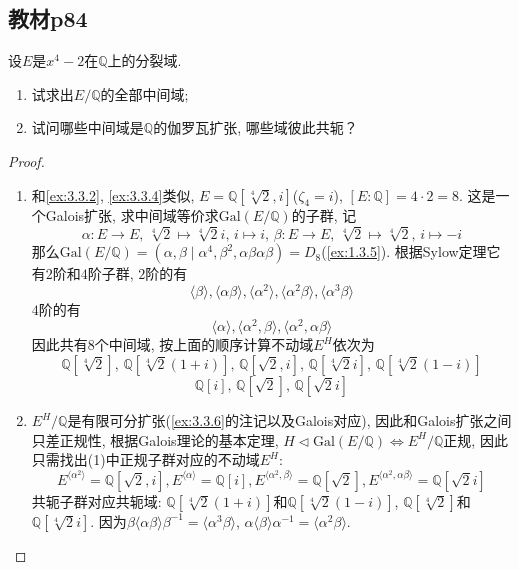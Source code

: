\subsection{教材p84}

\begin{problem}
    设$E$是$x^4-2$在$\mathbb{Q}$上的分裂域.
    \begin{enumerate}[(1)]
        \item 试求出$E/\mathbb{Q}$的全部中间域;
        \item 试问哪些中间域是$\mathbb{Q}$的伽罗瓦扩张, 哪些域彼此共轭？
    \end{enumerate}
\end{problem}

\begin{proof}
    \begin{enumerate}[(1)]
        \item 和\ref{ex:3.3.2}, \ref{ex:3.3.4}类似, $E = \mathbb{Q}[\sqrt[4]{2}, i]$($\zeta_4 = i$), $[E:\mathbb{Q}] = 4 \cdot 2 = 8$. 这是一个Galois扩张, 求中间域等价求$\mathrm{Gal}(E/\mathbb{Q})$的子群, 记
        \[
            \alpha:E \to E,\, \sqrt[4]{2} \mapsto \sqrt[4]{2}i,\, i \mapsto i,\, \beta:E \to E,\, \sqrt[4]{2} \mapsto \sqrt[4]{2},\, i \mapsto -i
        \]
        那么$\mathrm{Gal}(E/\mathbb{Q}) = (\alpha, \beta \mid \alpha^4, \beta^2, \alpha\beta\alpha\beta) = D_8$(\ref{ex:1.3.5}). 根据Sylow定理它有$2$阶和$4$阶子群, $2$阶的有
        \[
            \langle \beta \rangle, \langle \alpha\beta \rangle, \langle \alpha^2 \rangle, \langle \alpha^2\beta \rangle, \langle \alpha^3\beta \rangle
        \]
        $4$阶的有
        \[
            \langle \alpha \rangle, \langle \alpha^2, \beta \rangle, \langle \alpha^2, \alpha\beta \rangle
        \]
        因此共有$8$个中间域, 按上面的顺序计算不动域$E^H$依次为
        \[
            \mathbb{Q}[\sqrt[4]{2}],\, \mathbb{Q}[\sqrt[4]{2}(1 + i)],\, \mathbb{Q}[\sqrt{2}, i],\, \mathbb{Q}[\sqrt[4]{2}i],\, \mathbb{Q}[\sqrt[4]{2}(1 - i)]
        \]
        \[
            \mathbb{Q}[i],\, \mathbb{Q}[\sqrt{2}],\, \mathbb{Q}[\sqrt{2}i]
        \]
        \item $E^H/\mathbb{Q}$是有限可分扩张(\ref{ex:3.3.6}的注记以及Galois对应), 因此和Galois扩张之间只差正规性, 根据Galois理论的基本定理, $H \lhd \mathrm{Gal}(E/\mathbb{Q}) \iff E^H/\mathbb{Q}$正规, 因此只需找出(1)中正规子群对应的不动域$E^H$:
        \[
            E^{\langle \alpha^2 \rangle} = \mathbb{Q}[\sqrt{2}, i], E^{\langle \alpha \rangle} = \mathbb{Q}[i], E^{\langle \alpha^2, \beta \rangle} = \mathbb{Q}[\sqrt{2}], E^{\langle \alpha^2, \alpha\beta \rangle} = \mathbb{Q}[\sqrt{2}i]
        \]
        共轭子群对应共轭域: $\mathbb{Q}[\sqrt[4]{2}(1 + i)]$和$\mathbb{Q}[\sqrt[4]{2}(1 - i)]$, $\mathbb{Q}[\sqrt[4]{2}]$和$\mathbb{Q}[\sqrt[4]{2}i]$. 因为$\beta\langle \alpha\beta \rangle\beta^{-1} = \langle \alpha^3\beta \rangle$, $\alpha\langle \beta \rangle\alpha^{-1} = \langle \alpha^2\beta \rangle$.
    \end{enumerate}
\end{proof}

